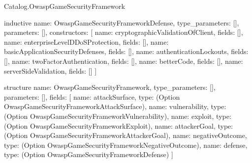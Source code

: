 \begin{lexlean}{Catalog.OwaspGameSecurityFramework}
\begin{semanticmodule}
inductive{
  name: OwaspGameSecurityFrameworkDefense,
  type_parameters: [],
  parameters: [],
  constructors: [
    {name: cryptographicValidationOfClient, fields: []},
    {name: enterpriseLevelDDoSProtection, fields: []},
    {name: basicApplicationSecurityDefenses, fields: []},
    {name: authenticationLockouts, fields: []},
    {name: twoFactorAuthentication, fields: []},
    {name: betterCode, fields: []},
    {name: serverSideValidation, fields: []}
  ]
}

structure{
  name: OwaspGameSecurityFramework,
  type_parameters: [],
  parameters: [],
  fields: [
    {name: attackSurface, type: (Option OwaspGameSecurityFrameworkAttackSurface)},
    {name: vulnerability, type: (Option OwaspGameSecurityFrameworkVulnerability)},
    {name: exploit, type: (Option OwaspGameSecurityFrameworkExploit)},
    {name: attackerGoal, type: (Option OwaspGameSecurityFrameworkAttackerGoal)},
    {name: negativeOutcome, type: (Option OwaspGameSecurityFrameworkNegativeOutcome)},
    {name: defense, type: (Option OwaspGameSecurityFrameworkDefense)}
  ]
}
\end{semanticmodule}
\end{lexlean}
